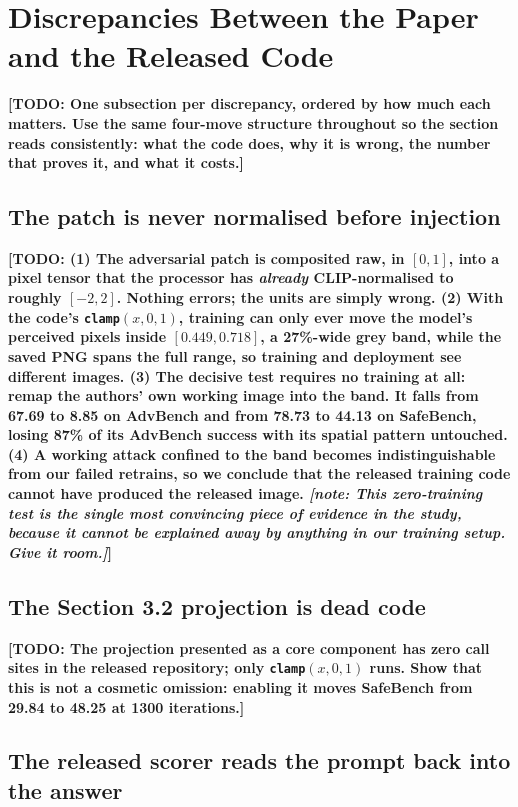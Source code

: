 \documentclass[10pt]{article} %
\newcommand{\todo}[1]{\textbf{[TODO: #1]}}
\newcommand{\note}[1]{\textit{[note: #1]}}          %
\begin{document}
\section{Discrepancies Between the Paper and the Released Code}
\label{sec:discrepancies}

\todo{One subsection per discrepancy, ordered by how much each matters. Use the same four-move structure throughout so the section reads consistently: what the code does, why it is wrong, the number that proves it, and what it costs.}

\subsection{The patch is never normalised before injection}

\todo{(1) The adversarial patch is composited raw, in $[0,1]$, into a pixel tensor that the processor has \emph{already} CLIP-normalised to roughly $[-2,2]$. Nothing errors; the units are simply wrong. (2) With the code's \texttt{clamp}$(x,0,1)$, training can only ever move the model's perceived pixels inside $[0.449, 0.718]$, a 27\%-wide grey band, while the saved PNG spans the full range, so training and deployment see different images. (3) The decisive test requires no training at all: remap the authors' own working image into the band. It falls from 67.69 to 8.85 on AdvBench and from 78.73 to 44.13 on SafeBench, losing 87\% of its AdvBench success with its spatial pattern untouched. (4) A working attack confined to the band becomes indistinguishable from our failed retrains, so we conclude that the released training code cannot have produced the released image. \note{This zero-training test is the single most convincing piece of evidence in the study, because it cannot be explained away by anything in our training setup. Give it room.}}

\subsection{The Section 3.2 projection is dead code}

\todo{The projection presented as a core component has zero call sites in the released repository; only \texttt{clamp}$(x,0,1)$ runs. Show that this is not a cosmetic omission: enabling it moves SafeBench from 29.84 to 48.25 at 1300 iterations.}

\subsection{The released scorer reads the prompt back into the answer}
\end{document}
